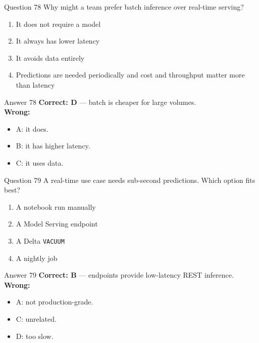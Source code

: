 \documentclass[aspectratio=169,11pt]{beamer}
\begin{document}
\begin{frame}{Question 78}
Why might a team prefer batch inference over real-time serving?
\begin{enumerate}[label=\Alph*.]
\item It does not require a model
\item It always has lower latency
\item It avoids data entirely
\item Predictions are needed periodically and cost and throughput matter more than latency
\end{enumerate}
\end{frame}
\begin{frame}{Answer 78}
\textbf{Correct: D} --- batch is cheaper for large volumes.\\
\vspace{0.5em}
\textbf{Wrong:}
\begin{itemize}
\item A: it does.
\item B: it has higher latency.
\item C: it uses data.
\end{itemize}
\end{frame}

\begin{frame}{Question 79}
A real-time use case needs sub-second predictions. Which option fits best?
\begin{enumerate}[label=\Alph*.]
\item A notebook run manually
\item A Model Serving endpoint
\item A Delta \texttt{VACUUM}
\item A nightly job
\end{enumerate}
\end{frame}
\begin{frame}{Answer 79}
\textbf{Correct: B} --- endpoints provide low-latency REST inference.\\
\vspace{0.5em}
\textbf{Wrong:}
\begin{itemize}
\item A: not production-grade.
\item C: unrelated.
\item D: too slow.
\end{itemize}
\end{frame}
\end{document}
